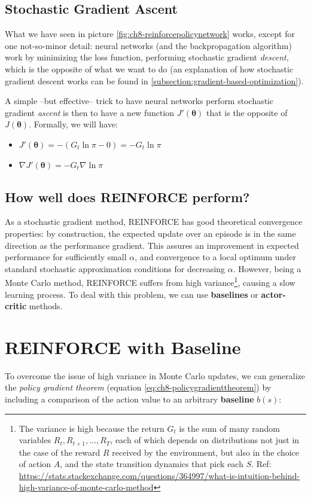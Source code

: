 \subsection{Stochastic Gradient Ascent}
What we have seen in picture \ref{fig:ch8-reinforcepolicynetwork} works, except for one not-so-minor detail: neural networks (and the backpropagation algorithm) work by minimizing the loss function, performing stochastic gradient \textit{descent}, which is the opposite of what we want to do (an explanation of how stochastic gradient descent works can be found in \autoref{subsection:gradient-based-optimization}).

A simple --but effective-- trick to have neural networks perform stochastic gradient \textit{ascent} is then to have a new function $J' (\boldsymbol{\theta})$ that is the opposite of $J(\boldsymbol{\theta})$. Formally, we will have:

\begin{itemize}
    \item $J' (\boldsymbol{\theta}) = -(G_t \ln{\pi} - 0) = -G_t \ln{\pi}$
    \item $\nabla J' (\boldsymbol{\theta}) = -G_t \nabla \ln{\pi}$
\end{itemize}

\subsection{How well does REINFORCE perform?}
As a stochastic gradient method, REINFORCE has good theoretical convergence properties: by construction, the expected update over an episode is in the same direction as the performance gradient. This assures an improvement in expected performance for sufficiently small $\alpha$, and convergence to a local optimum under standard stochastic approximation conditions for decreasing $\alpha$. However, being a Monte Carlo method, REINFORCE suffers from high variance\footnote{The variance is high because the return $G_t$ is the sum of many random variables $R_t, R_{t+1},...,R_T$, each of which depends on distributions not just in the case of the reward $R$ received by the environment, but also in the choice of action $A$, and the state transition dynamics that pick each $S$. Ref: \url{https://stats.stackexchange.com/questions/364997/what-is-intuition-behind-high-variance-of-monte-carlo-method}}, causing a slow learning process. To deal with this problem, we can use \textbf{baselines} or \textbf{actor-critic} methods.

\section{REINFORCE with Baseline}
To overcome the issue of high variance in Monte Carlo updates, we can generalize the \textit{policy gradient theorem} (equation \ref{eq:ch8-policygradienttheorem}) by including a comparison of the action value to an arbitrary \textbf{baseline} $b(s)$:

